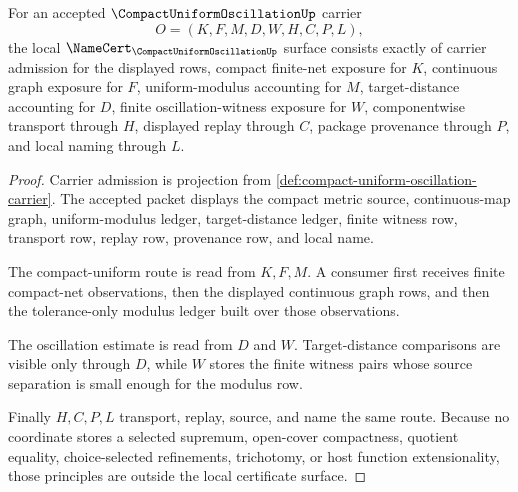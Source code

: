 \begin{theorem}
\label{thm:compact-uniform-oscillation-namecert-obligations}
For an accepted $\CompactUniformOscillationUp$ carrier
$$
O=(K,F,M,D,W,H,C,P,L),
$$
the local $\NameCert_{\CompactUniformOscillationUp}$ surface consists exactly of carrier admission for the displayed rows, compact finite-net exposure for $K$, continuous graph exposure for $F$, uniform-modulus accounting for $M$, target-distance accounting for $D$, finite oscillation-witness exposure for $W$, componentwise transport through $H$, displayed replay through $C$, package provenance through $P$, and local naming through $L$.
\end{theorem}
\begin{proof}
Carrier admission is projection from \autoref{def:compact-uniform-oscillation-carrier}. The accepted packet displays the compact metric source, continuous-map graph, uniform-modulus ledger, target-distance ledger, finite witness row, transport row, replay row, provenance row, and local name.

The compact-uniform route is read from $K,F,M$. A consumer first receives finite compact-net observations, then the displayed continuous graph rows, and then the tolerance-only modulus ledger built over those observations.

The oscillation estimate is read from $D$ and $W$. Target-distance comparisons are visible only through $D$, while $W$ stores the finite witness pairs whose source separation is small enough for the modulus row.

Finally $H,C,P,L$ transport, replay, source, and name the same route. Because no coordinate stores a selected supremum, open-cover compactness, quotient equality, choice-selected refinements, trichotomy, or host function extensionality, those principles are outside the local certificate surface.
\end{proof}

